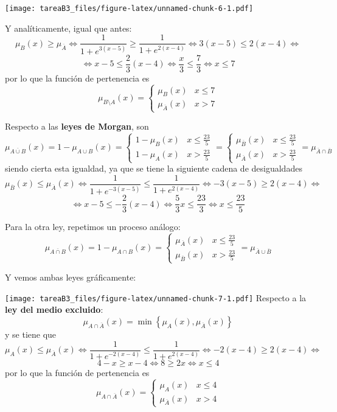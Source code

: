 \documentclass[
]{article}
\begin{document}
\texttt{[image: tareaB3\_files/figure-latex/unnamed-chunk-6-1.pdf]}

Y analíticamente, igual que antes:
\[\mu_{B}\left(x\right)\geq\mu_{\overline{A}}\iff\frac{1}{1+e^{3\left(x-5\right)}}\geq\frac{1}{1+e^{2\left(x-4\right)}}\iff3\left(x-5\right)\leq2\left(x-4\right)\iff\]
\[\iff x-5\leq\frac{2}{3}\left(x-4\right)\iff\frac{x}{3}\leq\frac{7}{3}\iff x\leq7\]
por lo que la función de pertenencia es
\[\mu_{B\setminus A}\left(x\right)=\begin{cases}
\mu_{B}\left(x\right) & x\leq7\\
\mu_{\overline{A}}\left(x\right) & x>7
\end{cases}\]

Respecto a las \textbf{leyes de Morgan}, son
\[\mu_{\overline{A\cup B}}\left(x\right)=1-\mu_{A\cup B}\left(x\right)=\begin{cases}
1-\mu_{B}\left(x\right) & x\leq\frac{23}{5}\\
1-\mu_{A}\left(x\right) & x>\frac{23}{5}
\end{cases}=\begin{cases}
\mu_{\overline{B}}\left(x\right) & x\leq\frac{23}{5}\\
\mu_{\overline{A}}\left(x\right) & x>\frac{23}{5}
\end{cases}=\mu_{\overline{A}\cap\overline{B}}\] siendo cierta esta
igualdad, ya que se tiene la siguiente cadena de desigualdades
\[\mu_{\overline{B}}\left(x\right)\leq\mu_{\overline{A}}\left(x\right)\iff\frac{1}{1+e^{-3\left(x-5\right)}}\leq\frac{1}{1+e^{2\left(x-4\right)}}\iff-3\left(x-5\right)\geq2\left(x-4\right)\iff\]
\[\iff x-5\leq-\frac{2}{3}\left(x-4\right)\iff\frac{5}{3}x\leq\frac{23}{3}\iff x\leq\frac{23}{5}\]

Para la otra ley, repetimos un proceso análogo:
\[\mu_{\overline{A\cap B}}\left(x\right)=1-\mu_{A\cap B}\left(x\right)=\begin{cases}
\mu_{\overline{A}}\left(x\right) & x\leq\frac{23}{5}\\
\mu_{\overline{B}}\left(x\right) & x>\frac{23}{5}
\end{cases}=\mu_{\overline{A}\cup\overline{B}}\]

Y vemos ambas leyes gráficamente:

\texttt{[image: tareaB3\_files/figure-latex/unnamed-chunk-7-1.pdf]}
Respecto a la \textbf{ley del medio excluido}:
\[\mu_{A\cap\overline{A}}\left(x\right)=\min\left\{ \mu_{A}\left(x\right),\mu_{\overline{A}}\left(x\right)\right\} \]
y se tiene que
\[\mu_{A}\left(x\right)\leq\mu_{\overline{A}}\left(x\right)\iff\frac{1}{1+e^{-2\left(x-4\right)}}\leq\frac{1}{1+e^{2\left(x-4\right)}}\iff-2\left(x-4\right)\geq2\left(x-4\right)\iff\]
\[4-x\geq x-4\iff8\geq2x\iff x\leq4\] por lo que la función de
pertenencia es \[\mu_{A\cap\overline{A}}\left(x\right)=\begin{cases}
\mu_{A}\left(x\right) & x\leq4\\
\mu_{\overline{A}}\left(x\right) & x>4
\end{cases}\]
\end{document}

